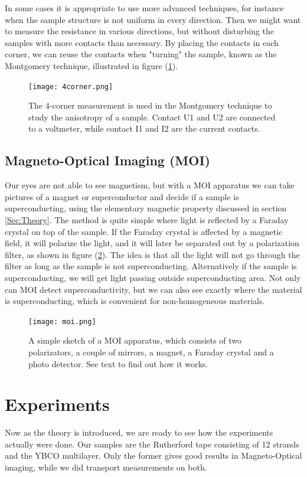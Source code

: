\documentclass{comjnl}
\begin{document}
In some cases it is appropriate to use more advanced techniques, for instance when the sample structure is not uniform in every direction. Then we might want to measure the resistance in various directions, but without disturbing the samples with more contacts than necessary. By placing the contacts in each corner, we can reuse the contacts when "turning" the sample, known as the Montgomery technique, illustrated in figure (\ref{fig:4corner}). 

\begin{figure}[h]
\centering
\texttt{[image: 4corner.png]}
\caption{The 4-corner measurement is used in the Montgomery technique to study the anisotropy of a sample. Contact U1 and U2 are connected to a voltmeter, while contact I1 and I2 are the current contacts. \label{fig:4corner}}
\end{figure}

\subsection{Magneto-Optical Imaging (MOI)}
Our eyes are not able to see magnetism, but with a MOI apparatus we can take pictures of a magnet or superconductor and decide if a sample is superconducting, using the elementary magnetic property discussed in section \ref{Sec:Theory}. The method is quite simple where light is reflected by a Faraday crystal on top of the sample. If the Faraday crystal is affected by a magnetic field, it will polarize the light, and it will later be separated out by a polarization filter, as shown in figure (\ref{fig:MOI}). The idea is that all the light will not go through the filter as long as the sample is not superconducting. Alternatively if the sample is superconducting, we will get light passing outside superconducting area. Not only can MOI detect superconductivity, but we can also see exactly where the material is superconducting, which is convenient for non-homogeneous materials. 
\begin{figure}[h]
\centering
\texttt{[image: moi.png]}
\caption{A simple sketch of a MOI apparatus, which consists of two polarizators, a couple of mirrors, a magnet, a Faraday crystal and a photo detector. See text to find out how it works. \label{fig:MOI}}
\end{figure}

\section{Experiments}\label{Sec:Experiments}
Now as the theory is introduced, we are ready to see how the experiments actually were done. Our samples are the Rutherford tape consisting of 12 strands and the YBCO multilayer. Only the former gives good results in Magneto-Optical imaging, while we did transport measurements on both. 
\end{document}
